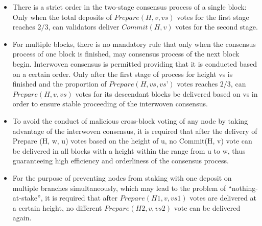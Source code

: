 \begin{itemize}
\item There is a strict order in the two-stage consensus process of a single block: Only when the total deposits of $Prepare(H, v, vs)$ votes for the first stage reaches $2/3$, can validators deliver $Commit(H, v)$ votes for the second stage.

\item For multiple blocks, there is no mandatory rule that only when the consensus process of one block is finished, may consensus process of the next block begin. Interwoven consensus is permitted providing that it is conducted based on a certain order. Only after the first stage of process for height vs is finished and the proportion of $Prepare(H, vs, vs’)$ votes reaches $2/3$, can $Prepare(H, v, vs)$ votes for its descendant blocks be delivered based on vs in order to ensure stable proceeding of the interwoven consensus.

\item To avoid the conduct of malicious cross-block voting of any node by taking advantage of the interwoven consensus, it is required that after the delivery of Prepare (H, w, u) votes based on the height of u, no Commit(H, v) vote can be delivered in all blocks with a height within the range from u to w, thus guaranteeing high efficiency and orderliness of the consensus process.

\item For the purpose of preventing nodes from staking with one deposit on multiple branches simultaneously, which may lead to the problem of “nothing-at-stake”, it is required that after $Prepare(H1, v, vs1)$ votes are delivered at a certain height, no different $Prepare(H2, v, vs2)$ vote can be delivered again.
\end{itemize}

